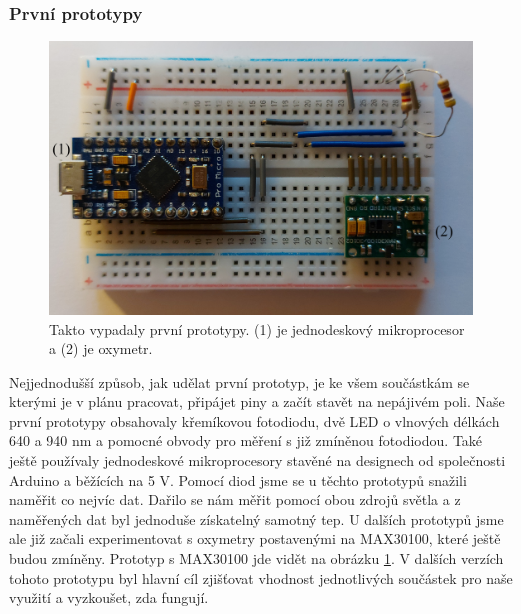 \subsubsection {První prototypy}
\begin{figure}[ht]
  \includegraphics[scale=0.27, center]{Kapitoly/Prakticka/Obrazky/První_prototypy.png}
  \caption [První prototyp]{Takto vypadaly první prototypy. (1) je jednodeskový mikroprocesor a (2) je oxymetr.}
  \label{fig:První_prototyp}
\end{figure}
Nejjednodušší způsob, jak udělat první prototyp, je ke všem součástkám se kterými je v plánu pracovat, připájet piny a začít stavět na nepájivém poli. Naše první prototypy obsahovaly křemíkovou fotodiodu, dvě LED o vlnových délkách 640 a 940 nm a pomocné obvody pro měření s již zmíněnou fotodiodou. Také ještě používaly jednodeskové mikroprocesory stavěné na designech od společnosti Arduino a běžících na 5 V. Pomocí diod jsme se u těchto prototypů snažili naměřit co nejvíc dat. Dařilo se nám měřit pomocí obou zdrojů světla a z naměřených dat byl jednoduše získatelný samotný tep. U dalších prototypů jsme ale již začali experimentovat s oxymetry postavenými na MAX30100, které ještě budou zmíněny. Prototyp s MAX30100 jde vidět na obrázku \ref{fig:První_prototyp}. V dalších verzích tohoto prototypu byl hlavní cíl zjišťovat vhodnost jednotlivých součástek pro naše využití a vyzkoušet, zda fungují.
